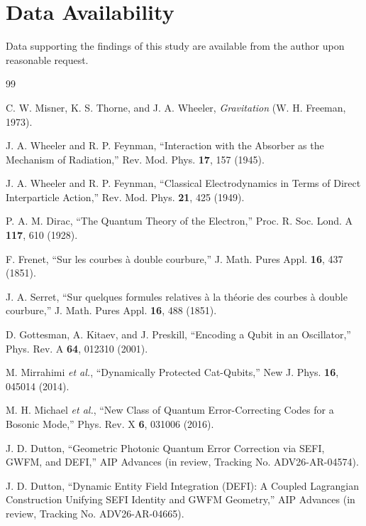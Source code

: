 \documentclass[aip,adv,reprint]{revtex4-2}
\begin{document}
\section{Data Availability}

Data supporting the findings of this study are available from the author upon
reasonable request.

\begin{thebibliography}{99}


C. W. Misner, K. S. Thorne, and J. A. Wheeler,
\textit{Gravitation} (W. H. Freeman, 1973).

J. A. Wheeler and R. P. Feynman,
``Interaction with the Absorber as the Mechanism of Radiation,''
Rev. Mod. Phys. \textbf{17}, 157 (1945).

J. A. Wheeler and R. P. Feynman,
``Classical Electrodynamics in Terms of Direct Interparticle Action,''
Rev. Mod. Phys. \textbf{21}, 425 (1949).

P. A. M. Dirac,
``The Quantum Theory of the Electron,''
Proc. R. Soc. Lond. A \textbf{117}, 610 (1928).

F. Frenet,
``Sur les courbes à double courbure,''
J. Math. Pures Appl. \textbf{16}, 437 (1851).

J. A. Serret,
``Sur quelques formules relatives à la théorie des courbes à double courbure,''
J. Math. Pures Appl. \textbf{16}, 488 (1851).

D. Gottesman, A. Kitaev, and J. Preskill,
``Encoding a Qubit in an Oscillator,''
Phys. Rev. A \textbf{64}, 012310 (2001).

M. Mirrahimi \textit{et al.},
``Dynamically Protected Cat-Qubits,''
New J. Phys. \textbf{16}, 045014 (2014).

M. H. Michael \textit{et al.},
``New Class of Quantum Error-Correcting Codes for a Bosonic Mode,''
Phys. Rev. X \textbf{6}, 031006 (2016).


J. D. Dutton,
``Geometric Photonic Quantum Error Correction via SEFI, GWFM, and DEFI,''
AIP Advances (in review, Tracking No. ADV26-AR-04574).

J. D. Dutton,
``Dynamic Entity Field Integration (DEFI): A Coupled Lagrangian Construction
Unifying SEFI Identity and GWFM Geometry,''
AIP Advances (in review, Tracking No. ADV26-AR-04665).


\end{thebibliography}
\end{document}
